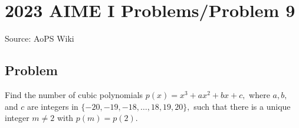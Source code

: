 \documentclass[12pt]{article}
\begin{document}
\section*{{2023 AIME I Problems/Problem 9}}
Source: AoPS Wiki

\subsection*{Problem}
Find the number of cubic polynomials $p(x) = x^3 + ax^2 + bx + c,$ where $a, b,$ and $c$ are integers in $\{-20,-19,-18,\ldots,18,19,20\},$ such that there is a unique integer $m \not= 2$ with $p(m) = p(2).$
\end{document}
